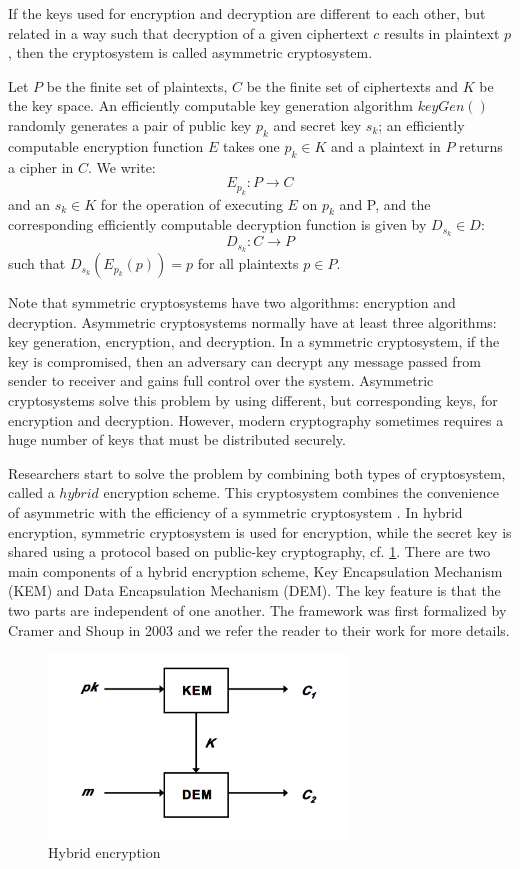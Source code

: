 If the keys used for encryption and decryption are different to each other, but related in a way such that  decryption of a given ciphertext $c$ results in plaintext $p$, then the cryptosystem is called asymmetric cryptosystem.

\begin{mydef} 
	Let $P$ be the finite set of plaintexts, $C$ be the finite set of ciphertexts and $K$ be the key space. An efficiently computable key generation algorithm $keyGen()$ randomly generates a pair of public key $p_{k}$ and secret key $s_{k}$; an efficiently computable encryption function 
	$E$ takes one $p_{k} \in K$ and a plaintext in $P$ returns a cipher in $C$. We write: $$E_{p_{k}} : P \rightarrow C $$ and an $s_{k} \in K$ for the operation of executing $E$ on $p_{k}$ and P, and the corresponding efficiently computable decryption function is given by $D_{s_{k}} \in D$: $$ D_{s_{k}} : C \rightarrow P$$ such that $D_{s_{k}}(E_{p_{k}}(p)) = p $ for all plaintexts $p \in P$.
\end{mydef}
Note that symmetric cryptosystems have two algorithms: encryption and decryption. Asymmetric cryptosystems normally have at least three algorithms: key generation, encryption, and decryption. In a symmetric cryptosystem, if the key is compromised, then an adversary can decrypt any message passed from sender to receiver and gains full control over the system. Asymmetric cryptosystems solve this problem by using different, but corresponding keys, for encryption and decryption. However, modern cryptography sometimes requires a huge number of keys that must be distributed securely. 

Researchers start to solve the problem by combining both types of cryptosystem, called a $hybrid$ encryption scheme. This cryptosystem combines the convenience of asymmetric with the efficiency of a symmetric cryptosystem \cite{simmons1992contemporary}. In hybrid encryption, symmetric cryptosystem is used for encryption, while the secret key is shared using a protocol based on public-key cryptography, cf. \ref{hybird}. There are two main components of a hybrid encryption scheme, Key Encapsulation Mechanism (KEM) and Data Encapsulation Mechanism (DEM). The key feature is that the two parts are independent of one another. The framework was first formalized by Cramer and Shoup in 2003 and we refer the reader to their work \cite{cramer2003design} for more details.
\begin{figure}[h!]
	\centering
	\includegraphics[width=80mm]{./pics/HybridEnc.png}
	\caption{Hybrid encryption}
	\label{hybird}
\end{figure}
